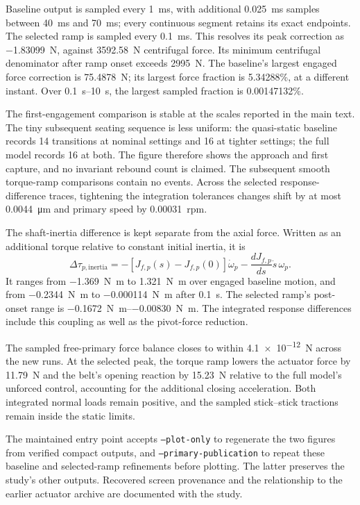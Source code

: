 \documentclass[11pt]{report}
\numberwithin{equation}{section}
\begin{document}
Baseline output is sampled every \SI{1}{ms}, with additional
\SI{0.025}{ms} samples between \SI{40}{ms} and \SI{70}{ms}; every
continuous segment retains its exact endpoints. The selected ramp is sampled
every \SI{0.1}{ms}. This resolves its peak correction as \SI{-1.83099}{N},
against \SI{3592.58}{N} centrifugal force. Its minimum centrifugal
denominator after ramp onset exceeds \SI{2995}{N}. The baseline's largest
engaged force correction is \SI{75.4878}{N}; its largest force fraction is
\num{5.34288}\%, at a different instant. Over \SIrange{0.1}{10}{s},
the largest sampled fraction is \num{0.00147132}\%.

The first-engagement comparison is stable at the scales reported in the
main text. The tiny subsequent seating sequence is less uniform: the
quasi-static baseline records 14 transitions at nominal settings and 16 at
tighter settings; the full model records 16 at both. The figure therefore
shows the approach and first capture, and no invariant rebound count is
claimed. The subsequent smooth torque-ramp comparisons contain no events.
Across the selected response-difference traces, tightening the integration
tolerances changes shift by at most \SI{0.0044}{\micro\metre} and primary
speed by \SI{0.00031}{rpm}.

The shaft-inertia difference is kept separate from the axial force. Written
as an additional torque relative to constant initial inertia, it is
\begin{equation}
 \Delta\tau_{p,\mathrm{inertia}}
 =-[J_{f,p}(s)-J_{f,p}(0)]\dot\omega_p
   -\frac{dJ_{f,p}}{ds}\dot s\,\omega_p.
 \label{eq:primary_inertia_torque_diagnostic}
\end{equation}
It ranges from \SI{-1.369}{N.m} to \SI{1.321}{N.m} over engaged baseline
motion, and from \SI{-0.2344}{N.m} to \SI{-0.000114}{N.m} after
\SI{0.1}{s}. The selected ramp's post-onset range is
\SIrange{-0.1672}{-0.00830}{N.m}. The integrated response differences include
this coupling as well as the pivot-force reduction.

The sampled free-primary force balance closes to within \SI{4.1e-12}{N}
across the new runs. At the selected peak, the torque ramp lowers the actuator
force by \SI{11.79}{N} and the belt's opening reaction by \SI{15.23}{N}
relative to the full model's unforced control, accounting for the additional
closing acceleration. Both integrated normal loads remain positive, and
the sampled stick--stick tractions remain inside the static limits.

The maintained entry point
accepts \texttt{--plot-only} to regenerate the two figures from verified
compact outputs, and \texttt{--primary-publication} to repeat these
baseline and selected-ramp refinements before plotting. The latter preserves
the study's other outputs. Recovered screen provenance and the relationship
to the earlier actuator archive are documented with the study.
\FloatBarrier
\end{document}
